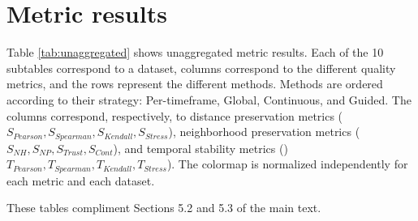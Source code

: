 \section{Metric results}

Table \ref{tab:unaggregated} shows unaggregated metric results. Each of the 10 subtables correspond to a dataset, columns correspond to the different quality metrics, and the rows represent the different methods.
Methods are ordered according to their strategy: Per-timeframe, Global, Continuous, and Guided. 
The columns correspond, respectively, to distance preservation metrics ($S_{Pearson}, S_{Spearman}, S_{Kendall}, S_{Stress}$), neighborhood preservation metrics ($S_{NH}, S_{NP}, S_{Trust}, S_{Cont}$), and temporal stability metrics ()$T_{Pearson}, T_{Spearman}, T_{Kendall}, T_{Stress}$). The colormap is normalized independently for each metric and each dataset.

These tables compliment Sections 5.2 and 5.3 of the main text.


